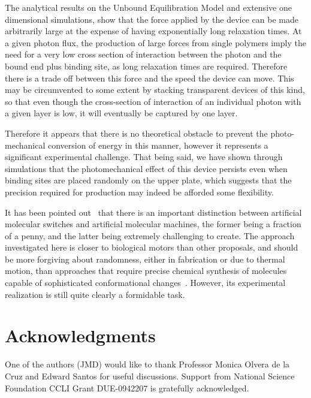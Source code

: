 \documentclass[journal = mamobx, manuscript = article]{achemso}
\begin{document}
The analytical results on the Unbound Equilibration Model and extensive one
dimensional simulations, show that the force
applied by the device can be made arbitrarily large at the expense of having
exponentially long relaxation times. At a given photon flux, the production of large forces 
from single polymers imply the need for a very low 
cross section of interaction between the photon and the bound end plus binding
site, as long relaxation times are required. Therefore there is a trade off between this force
and the speed the device can move. This may be circumvented to some extent by
stacking transparent devices of this kind, so that even though the cross-section of interaction of an
individual photon with a given layer is low, it will eventually be captured
by one layer. 

Therefore it appears that there is no theoretical obstacle to prevent
the photo-mechanical conversion of energy in this manner, however
it represents a significant experimental challenge. That being said, we have shown through simulations that the photomechanical effect of this device persists even when binding sites are placed randomly on the upper plate, which suggests that the precision required for production may indeed be afforded some flexibility.

It has been pointed out~\cite{GrzybowskiReview} that there is an important
distinction between artificial molecular switches and artificial molecular
machines, the former being a fraction of a penny, and the latter being extremely
challenging to create. The approach investigated here is closer to biological
motors than other proposals, and should be more forgiving about randomness, either 
in fabrication or due to thermal motion, than approaches that require precise chemical synthesis
of molecules capable of sophisticated conformational changes~\cite{credi2006}.
However, its experimental realization is still quite clearly a formidable task.

\section{Acknowledgments}

One of the authors (JMD) would like to thank Professor Monica Olvera de la Cruz and Edward
Santos for useful discussions. Support from  National Science Foundation
CCLI Grant DUE-0942207 is gratefully acknowledged.
\end{document}
